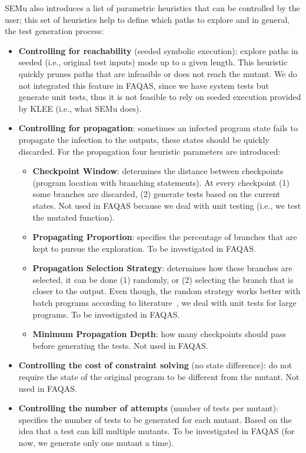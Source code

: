 SEMu also introduces a list of parametric heuristics that can be controlled by the user; this set of heuristics help to define which paths to explore and in general, the test generation process:

\begin{itemize}
	\item \textbf{Controlling for reachability} (seeded symbolic execution): explore paths in seeded (i.e., original test inputs) mode up to a given length. This heuristic quickly prunes paths that are infeasible or does not reach the mutant. We do not integrated this feature in FAQAS, since we have system tests but generate unit tests, thus it is not feasible to rely on seeded execution provided by KLEE (i.e., what SEMu does).

	\item \textbf{Controlling for propagation}: sometimes an infected program state fails to propagate the infection to the outputs, these states should be quickly discarded. For the propagation four heuristic parameters are introduced:
	\begin{itemize}
		\item \textbf{Checkpoint Window}: determines the distance between checkpoints (program location with branching statements). At every checkpoint (1) some branches are discarded, (2) generate tests based on the current states. Not used in FAQAS because we deal with unit testing (i.e., we test the mutated function).
		\item \textbf{Propagating Proportion}: specifies the percentage of branches that are kept to pursue the exploration. To be investigated in FAQAS.
		\item \textbf{Propagation Selection Strategy}: determines how these branches are selected, it can be done (1) randomly, or (2) selecting the branch that is closer to the output. Even though, the random strategy works better with batch programs according to literature~\cite{chekam2021killing}, we deal with unit tests for large programs. To be investigated in FAQAS. 
	\item \textbf{Minimum Propagation Depth}: how many checkpoints should pass before generating the tests. Not used in FAQAS.
	\end{itemize}


	\item \textbf{Controlling the cost of constraint solving} (no state difference): do not require the state of the original program to be different from the mutant. Not used in FAQAS.

	\item \textbf{Controlling the number of attempts} (number of tests per mutant): specifies the number of tests to be generated for each mutant. Based on the idea that a test can kill multiple mutants. To be investigated in FAQAS (for now, we generate only one mutant a time).

\end{itemize}


